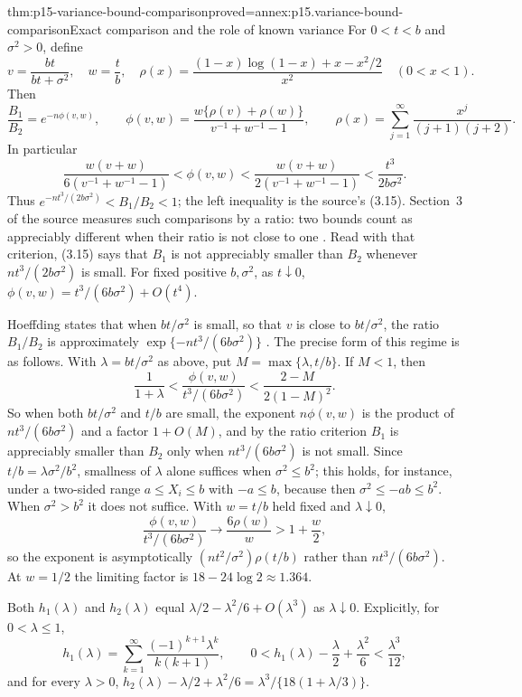 \begin{hbtheorem}{thm:p15-variance-bound-comparison}{proved=annex:p15.variance-bound-comparison}{Exact comparison and the role of known variance}
For \(0<t<b\) and \(\sigma^2>0\), define
\[
 v=\frac{bt}{bt+\sigma^2},\quad w=\frac tb,\quad
 \rho(x)=\frac{(1-x)\log(1-x)+x-x^2/2}{x^2}\quad(0<x<1).
\]
Then
\[
 \frac{B_1}{B_2}=e^{-n\phi(v,w)},\qquad
 \phi(v,w)=\frac{w\{\rho(v)+\rho(w)\}}{v^{-1}+w^{-1}-1},
 \qquad
 \rho(x)=\sum_{j=1}^{\infty}\frac{x^j}{(j+1)(j+2)}.
\]
In particular
\[
 \frac{w(v+w)}{6(v^{-1}+w^{-1}-1)}
 <\phi(v,w)<
 \frac{w(v+w)}{2(v^{-1}+w^{-1}-1)}
 <\frac{t^3}{2b\sigma^2}.
\]
Thus \(e^{-nt^3/(2b\sigma^2)}<B_1/B_2<1\); the left inequality is the
source's (3.15). Section~3 of the source measures such comparisons by a
ratio: two bounds count as appreciably different when their ratio is
not close to one \cite[p.~18]{Hoeffding1963BoundedSums}. Read with that
criterion, (3.15) says that \(B_1\) is not appreciably smaller than
\(B_2\) whenever \(nt^3/(2b\sigma^2)\) is small.
For fixed positive \(b,\sigma^2\), as \(t\downarrow0\),
\(\phi(v,w)=t^3/(6b\sigma^2)+O(t^4)\).

Hoeffding states that when \(bt/\sigma^2\) is small, so that \(v\) is
close to \(bt/\sigma^2\), the ratio \(B_1/B_2\) is approximately
\(\exp\{-nt^3/(6b\sigma^2)\}\) \cite[p.~20]{Hoeffding1963BoundedSums}.
The precise form of this regime is as follows. With \(\lambda=bt/\sigma^2\)
as above, put \(M=\max\{\lambda,t/b\}\). If \(M<1\), then
\[
 \frac1{1+\lambda}
 <\frac{\phi(v,w)}{t^3/(6b\sigma^2)}
 <\frac{2-M}{2(1-M)^2}.
\]
So when both \(bt/\sigma^2\) and \(t/b\) are small, the exponent
\(n\phi(v,w)\) is the product of \(nt^3/(6b\sigma^2)\) and a factor
\(1+O(M)\), and by the ratio criterion \(B_1\) is appreciably smaller
than \(B_2\) only when \(nt^3/(6b\sigma^2)\) is not small. Since
\(t/b=\lambda\sigma^2/b^2\), smallness of \(\lambda\) alone suffices when
\(\sigma^2\leq b^2\); this holds, for instance, under a two-sided
range \(a\leq X_i\leq b\) with \(-a\leq b\), because then
\(\sigma^2\leq-ab\leq b^2\). When \(\sigma^2>b^2\) it does not suffice.
With \(w=t/b\) held fixed and \(\lambda\downarrow0\),
\[
 \frac{\phi(v,w)}{t^3/(6b\sigma^2)}\longrightarrow\frac{6\rho(w)}w
 >1+\frac w2,
\]
so the exponent is asymptotically \((nt^2/\sigma^2)\rho(t/b)\) rather
than \(nt^3/(6b\sigma^2)\). At \(w=1/2\) the limiting factor is
\(18-24\log2\approx1.364\).

Both \(h_1(\lambda)\) and \(h_2(\lambda)\) equal
\(\lambda/2-\lambda^2/6+O(\lambda^3)\) as \(\lambda\downarrow0\).
Explicitly, for \(0<\lambda\leq1\),
\[
 h_1(\lambda)=\sum_{k=1}^\infty\frac{(-1)^{k+1}\lambda^k}{k(k+1)},
 \qquad
 0<h_1(\lambda)-\frac\lambda2+\frac{\lambda^2}6<\frac{\lambda^3}{12},
\]
and for every \(\lambda>0\),
\(h_2(\lambda)-\lambda/2+\lambda^2/6=\lambda^3/\{18(1+\lambda/3)\}\).


\end{hbtheorem}
